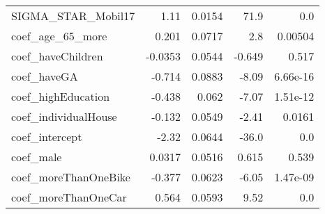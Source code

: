 \begin{tabular}{lrrrr}
SIGMA\_STAR\_Mobil17   &    1.11 &        0.0154 &         71.9 &           0.0 \\
coef\_age\_65\_more     &   0.201 &        0.0717 &          2.8 &       0.00504 \\
coef\_haveChildren    & -0.0353 &        0.0544 &       -0.649 &         0.517 \\
coef\_haveGA          &  -0.714 &        0.0883 &        -8.09 &      6.66e-16 \\
coef\_highEducation   &  -0.438 &         0.062 &        -7.07 &      1.51e-12 \\
coef\_individualHouse &  -0.132 &        0.0549 &        -2.41 &        0.0161 \\
coef\_intercept       &   -2.32 &        0.0644 &        -36.0 &           0.0 \\
coef\_male            &  0.0317 &        0.0516 &        0.615 &         0.539 \\
coef\_moreThanOneBike &  -0.377 &        0.0623 &        -6.05 &      1.47e-09 \\
coef\_moreThanOneCar  &   0.564 &        0.0593 &         9.52 &           0.0 \\
\bottomrule
\end{tabular}

